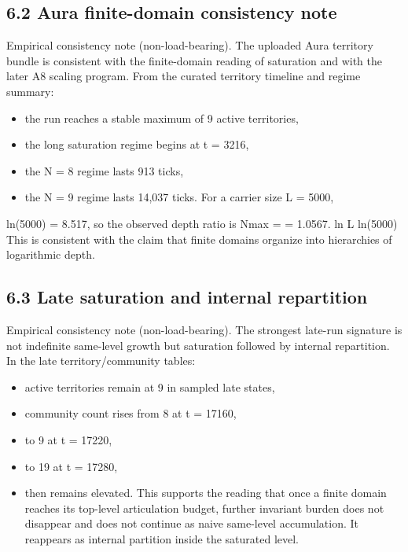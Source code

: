 \documentclass[11pt]{article}
\begin{document}
\subsection{6.2 Aura finite-domain consistency note}\label{aura-finite-domain-consistency-note}

Empirical consistency note (non-load-bearing). The uploaded Aura territory bundle is consistent with the finite-domain reading of saturation and with the later A8 scaling program. From the curated territory timeline and regime summary:

\begin{itemize}
\item
  the run reaches a stable maximum of 9 active territories,
\item
  the long saturation regime begins at t = 3216,
\item
  the N = 8 regime lasts 913 ticks,
\item
  the N = 9 regime lasts 14,037 ticks. For a carrier size L = 5000,
\end{itemize}

ln(5000) = 8.517, so the observed depth ratio is Nmax = = 1.0567. ln L ln(5000) This is consistent with the claim that finite domains organize into hierarchies of logarithmic depth.

\subsection{6.3 Late saturation and internal repartition}\label{late-saturation-and-internal-repartition}

Empirical consistency note (non-load-bearing). The strongest late-run signature is not indefinite same-level growth but saturation followed by internal repartition. In the late territory/community tables:

\begin{itemize}
\item
  active territories remain at 9 in sampled late states,
\item
  community count rises from 8 at t = 17160,
\item
  to 9 at t = 17220,
\item
  to 19 at t = 17280,
\item
  then remains elevated. This supports the reading that once a finite domain reaches its top-level articulation budget, further invariant burden does not disappear and does not continue as naive same-level accumulation. It reappears as internal partition inside the saturated level.
\end{itemize}
\end{document}
